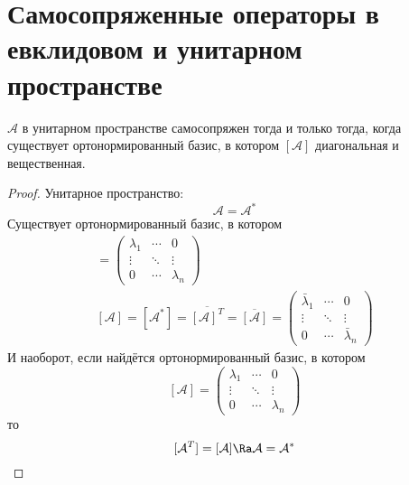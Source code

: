\section{Самосопряженные операторы в евклидовом и унитарном пространстве}

\begin{theorem}
	$\mathcal A$ в унитарном пространстве самосопряжен тогда и только тогда, когда
	существует ортонормированный базис, в котором $[\mathcal A]$ диагональная и вещественная.
\end{theorem}
\begin{proof}
	Унитарное пространство:
	\[ \mathcal A = \mathcal{A}^* \]
	Существует ортонормированный базис, в котором
	\begin{gather*}
		[\mathcal A]
		= \begin{pmatrix}
			\lambda_1 & \cdots & 0 \\
			\vdots & \ddots & \vdots \\
			0 & \cdots & \lambda_n
		\end{pmatrix} \\
		[\mathcal A]
		= [\mathcal{A}^*]
		= \overline{[\mathcal A]^T}
		= \overline{[\mathcal A]}
		= \begin{pmatrix}
			\bar\lambda_1 & \cdots & 0 \\
			\vdots & \ddots & \vdots \\
			0 & \cdots & \bar\lambda_n
		\end{pmatrix}
	\end{gather*}
	И наоборот, если найдётся ортонормированный базис, в котором
	\[
		[\mathcal A]
		= \begin{pmatrix}
			\lambda_1 & \cdots & 0 \\
			\vdots & \ddots & \vdots \\
			0 & \cdots & \lambda_n
		\end{pmatrix}
	\]
	то
	\[
		[\mathcal{A}^T] = [\mathcal A] \Ra \mathcal A = \mathcal{A}^*
	\]
\end{proof}

